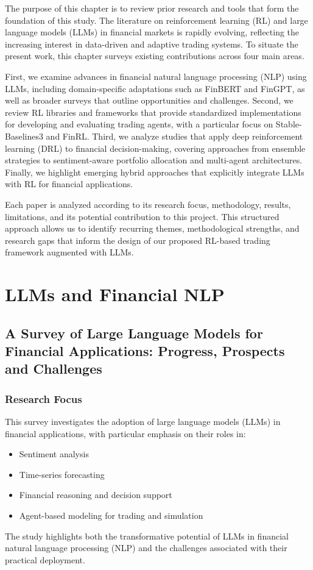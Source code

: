 \documentclass[12pt,a4paper]{report}
\begin{document}
The purpose of this chapter is to review prior research and tools that form the foundation of this study. The literature on reinforcement learning (RL) and large language models (LLMs) in financial markets is rapidly evolving, reflecting the increasing interest in data-driven and adaptive trading systems. To situate the present work, this chapter surveys existing contributions across four main areas.  

First, we examine advances in financial natural language processing (NLP) using LLMs, including domain-specific adaptations such as FinBERT and FinGPT, as well as broader surveys that outline opportunities and challenges. Second, we review RL libraries and frameworks that provide standardized implementations for developing and evaluating trading agents, with a particular focus on Stable-Baselines3 and FinRL. Third, we analyze studies that apply deep reinforcement learning (DRL) to financial decision-making, covering approaches from ensemble strategies to sentiment-aware portfolio allocation and multi-agent architectures. Finally, we highlight emerging hybrid approaches that explicitly integrate LLMs with RL for financial applications.  

Each paper is analyzed according to its research focus, methodology, results, limitations, and its potential contribution to this project. This structured approach allows us to identify recurring themes, methodological strengths, and research gaps that inform the design of our proposed RL-based trading framework augmented with LLMs.

\section{LLMs and Financial NLP}

\subsection{A Survey of Large Language Models for Financial Applications: Progress, Prospects and Challenges \cite{nie2024survey}}

\subsubsection{Research Focus}
This survey investigates the adoption of large language models (LLMs) in financial applications, with particular emphasis on their roles in:
\begin{itemize}
    \item Sentiment analysis
    \item Time-series forecasting
    \item Financial reasoning and decision support
    \item Agent-based modeling for trading and simulation
\end{itemize}
The study highlights both the transformative potential of LLMs in financial natural language processing (NLP) and the challenges associated with their practical deployment.
\end{document}
